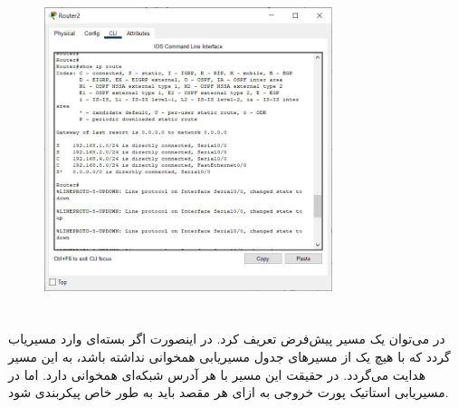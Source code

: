\documentclass{article}
\begin{document}
\begin{figure}[H]
    \centering
    \includegraphics[width=0.75\textwidth]{figures/24.jpg}
    \caption{}
    \label{fig:fig1}
\end{figure}
\section{}%
در  می‌توان یک مسیر پیش‌فرض تعریف کرد. در اینصورت اگر بسته‌ای وارد مسیریاب گردد که با هیچ یک از مسیرهای جدول مسیریابی همخوانی نداشته باشد، به این مسیر هدایت می‌گردد. در حقیقت این مسیر با هر آدرس شبکه‌ای همخوانی دارد. اما در مسیریابی استاتیک پورت خروجی به ازای هر مقصد باید به طور خاص پیکربندی شود.
\end{document}

